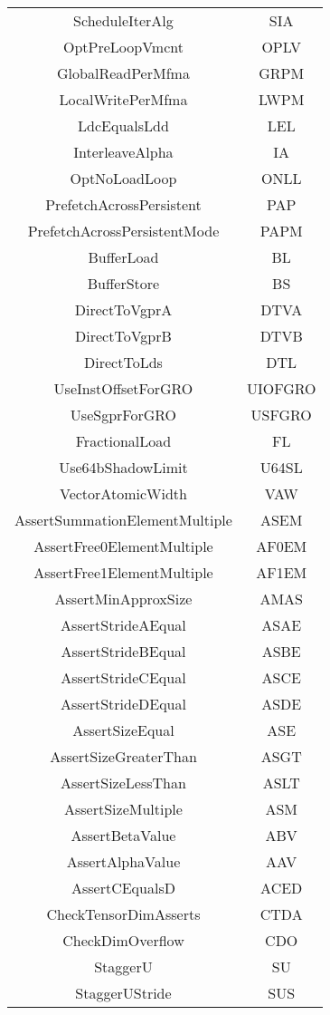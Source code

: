 \documentclass[]{article}
\begin{document}
\begin{center}
\begin{small}
\begin{longtable}{ |c|c| }
 ScheduleIterAlg & SIA \\
 OptPreLoopVmcnt & OPLV \\
 GlobalReadPerMfma & GRPM \\
 LocalWritePerMfma & LWPM \\
 LdcEqualsLdd & LEL \\
 InterleaveAlpha & IA \\
 OptNoLoadLoop & ONLL \\
 PrefetchAcrossPersistent & PAP \\
 PrefetchAcrossPersistentMode & PAPM \\
 BufferLoad & BL \\
 BufferStore & BS \\
 DirectToVgprA & DTVA \\
 DirectToVgprB & DTVB \\
 DirectToLds & DTL \\
 UseInstOffsetForGRO & UIOFGRO \\
 UseSgprForGRO & USFGRO \\
 FractionalLoad & FL \\
 Use64bShadowLimit & U64SL \\
 VectorAtomicWidth & VAW \\
 AssertSummationElementMultiple & ASEM \\
 AssertFree0ElementMultiple & AF0EM \\
 AssertFree1ElementMultiple & AF1EM \\
 AssertMinApproxSize & AMAS \\
 AssertStrideAEqual & ASAE \\
 AssertStrideBEqual & ASBE \\
 AssertStrideCEqual & ASCE \\
 AssertStrideDEqual & ASDE \\
 AssertSizeEqual & ASE \\
 AssertSizeGreaterThan & ASGT \\
 AssertSizeLessThan & ASLT \\
 AssertSizeMultiple & ASM \\
 AssertBetaValue & ABV \\
 AssertAlphaValue & AAV \\
 AssertCEqualsD & ACED \\
 CheckTensorDimAsserts & CTDA \\
 CheckDimOverflow & CDO \\
 StaggerU & SU \\
 StaggerUStride & SUS \\

\end{longtable}
\end{small}
\end{center}
\end{document}
